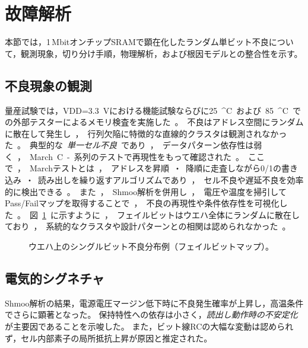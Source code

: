 \documentclass[conference]{IEEEtran}
\begin{document}
\section{故障解析}
本節では，1\,MbitオンチップSRAMで顕在化したランダム単ビット不良について，観測現象，切り分け手順，物理解析，および根因モデルとの整合性を示す。

\subsection{不良現象の観測}
量産試験では，VDD=\SI{3.3}{V}における機能試験ならびに\SI{25}{^\circ C}および\SI{85}{^\circ C}での外部テスターによるメモリ検査を実施した。  
不良はアドレス空間にランダムに散在して発生し，行列欠陥に特徴的な直線的クラスタは観測されなかった。  
典型的な\emph{単一セル不良}であり，データパターン依存性は弱く，March C-系列のテストで再現性をもって確認された。  

ここで，Marchテストとは，アドレスを昇順・降順に走査しながら0/1の書き込み・読み出しを繰り返すアルゴリズムであり，セル不良や遅延不良を効率的に検出できる。  
また，Shmoo解析を併用し，電圧や温度を掃引してPass/Failマップを取得することで，不良の再現性や条件依存性を可視化した。
図\ref{fig:failmap}に示すように，フェイルビットはウエハ全体にランダムに散在しており，
系統的なクラスタや設計パターンとの相関は認められなかった。

\begin{figure}[!t]
\centering
{} %
\caption{ウエハ上のシングルビット不良分布例（フェイルビットマップ）。}
\label{fig:failmap}
\end{figure}

\subsection{電気的シグネチャ}
Shmoo解析の結果，電源電圧マージン低下時に不良発生確率が上昇し，高温条件でさらに顕著となった。  
保持特性への依存は小さく，\emph{読出し動作時の不安定化}が主要因であることを示唆した。  
また，ビット線RCの大幅な変動は認められず，セル内部素子の局所抵抗上昇が原因と推定された。
\end{document}
